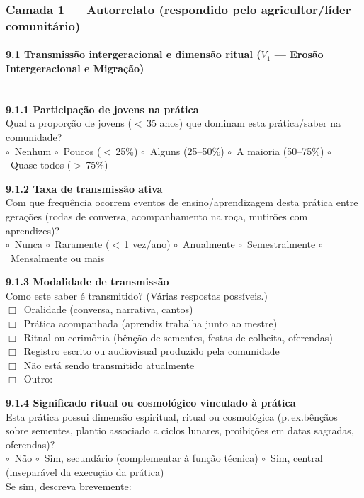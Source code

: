 \subsubsection{Camada 1 --- Autorrelato (respondido pelo agricultor/líder comunitário)}

\paragraph{9.1 Transmissão intergeracional e dimensão ritual ($V_1$ --- Erosão Intergeracional e Migração)}~\\[4pt]

\textbf{9.1.1 Participação de jovens na prática}\\[2pt]
Qual a proporção de jovens ($<$\,35 anos) que dominam esta prática/saber na comunidade?\\
$\circ$~Nenhum \quad $\circ$~Poucos ($<$\,25\%) \quad $\circ$~Alguns (25--50\%) \quad $\circ$~A maioria (50--75\%) \quad $\circ$~Quase todos ($>$\,75\%)

\medskip\noindent\textbf{9.1.2 Taxa de transmissão ativa}\\[2pt]
Com que frequência ocorrem eventos de ensino/aprendizagem desta prática entre gerações (rodas de conversa, acompanhamento na roça, mutirões com aprendizes)?\\
$\circ$~Nunca \quad $\circ$~Raramente ($<$\,1 vez/ano) \quad $\circ$~Anualmente \quad $\circ$~Semestralmente \quad $\circ$~Mensalmente ou mais

\medskip\noindent\textbf{9.1.3 Modalidade de transmissão}\\[2pt]
Como este saber é transmitido? (Várias respostas possíveis.)\\
$\Box$~Oralidade (conversa, narrativa, cantos)\\
$\Box$~Prática acompanhada (aprendiz trabalha junto ao mestre)\\
$\Box$~Ritual ou cerimônia (bênção de sementes, festas de colheita, oferendas)\\
$\Box$~Registro escrito ou audiovisual produzido pela comunidade\\
$\Box$~Não está sendo transmitido atualmente\\
$\Box$~Outro: \dotfill

\medskip\noindent\textbf{9.1.4 Significado ritual ou cosmológico vinculado à prática}\\[2pt]
Esta prática possui dimensão espiritual, ritual ou cosmológica (p.\,ex.\@ bênçãos sobre sementes, plantio associado a ciclos lunares, proibições em datas sagradas, oferendas)?\\
$\circ$~Não \quad $\circ$~Sim, secundário (complementar à função técnica) \quad $\circ$~Sim, central (inseparável da execução da prática)\\[2pt]
Se sim, descreva brevemente: \dotfill\\[2pt]\dotfill

